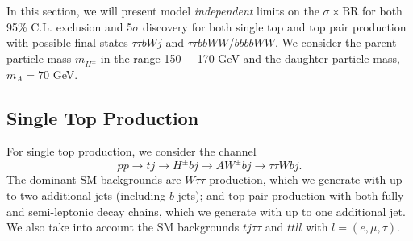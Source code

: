 In this section, we will present model \emph{independent} limits on the $\sigma\times\text{BR}$ for both 95\% C.L. exclusion and 5$\sigma$ discovery for both single top and top pair production with possible final states $\tau\tau bW j$ and $\tau\tau bbWW$/$bbbbWW$. We consider the parent particle mass $m_{H^{\pm}}$ in the range 150 $-$ 170 GeV and the daughter particle mass, $m_A=70$ GeV. 


\subsection{Single Top Production}
 \label{sec:light_charged_analysis_tj}
 
For single top production, we consider the channel\
\begin{equation}
pp\rightarrow tj\rightarrow H^{\pm} bj\rightarrow AW^{\pm}bj \rightarrow \tau\tau W bj.
\end{equation} The dominant SM backgrounds are $W\tau\tau$ production, which we generate with up to two additional jets (including $b$ jets); and top pair production with both fully and semi-leptonic decay chains, which we generate with up to one additional jet. We also take into account the SM backgrounds $tj\tau\tau$ and $ttll$ with $l= (e, \mu, \tau)$.

